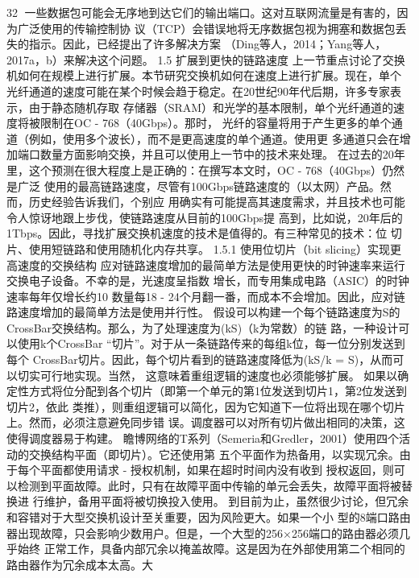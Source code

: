                                                                     32
一些数据包可能会无序地到达它们的输出端口。这对互联网流量是有害的，因为广泛使用的传输控制协
议（TCP）会错误地将无序数据包视为拥塞和数据包丢失的指示。因此，已经提出了许多解决方案
（Ding等人，2014；Yang等人，2017a，b）来解决这个问题。
1.5 扩展到更快的链路速度
上一节重点讨论了交换机如何在规模上进行扩展。本节研究交换机如何在速度上进行扩展。现在，单个
光纤通道的速度可能在某个时候会趋于稳定。在20世纪90年代后期，许多专家表示，由于静态随机存取
存储器（SRAM）和光学的基本限制，单个光纤通道的速度将被限制在OC - 768（40Gbps）。那时，
光纤的容量将用于产生更多的单个通道（例如，使用多个波长），而不是更高速度的单个通道。使用更
多通道只会在增加端口数量方面影响交换，并且可以使用上一节中的技术来处理。
在过去的20年里，这个预测在很大程度上是正确的：在撰写本文时，OC - 768（40Gbps）仍然是广泛
使用的最高链路速度，尽管有100Gbps链路速度的（以太网）产品。然而，历史经验告诉我们，个别应
用确实有可能提高其速度需求，并且技术也可能令人惊讶地跟上步伐，使链路速度从目前的100Gbps提
高到，比如说，20年后的1Tbps。因此，寻找扩展交换机速度的技术是值得的。有三种常见的技术：位
切片、使用短链路和使用随机化内存共享。
1.5.1 使用位切片（bit slicing）实现更高速度的交换结构
应对链路速度增加的最简单方法是使用更快的时钟速率来运行交换电子设备。不幸的是，光速度呈指数
增长，而专用集成电路（ASIC）的时钟速率每年仅增长约10%
数量每18 - 24个月翻一番，而成本不会增加。因此，应对链路速度增加的最简单方法是使用并行性。
假设可以构建一个每个链路速度为S的CrossBar交换结构。那么，为了处理速度为(kS)（k为常数）的链
路，一种设计可以使用k个CrossBar “切片”。对于从一条链路传来的每组k位，每一位分别发送到每个
CrossBar切片。因此，每个切片看到的链路速度降低为(kS/k = S)，从而可以切实可行地实现。当然，
这意味着重组逻辑的速度也必须能够扩展。
如果以确定性方式将位分配到各个切片（即第一个单元的第1位发送到切片1，第2位发送到切片2，依此
类推），则重组逻辑可以简化，因为它知道下一位将出现在哪个切片上。然而，必须注意避免同步错
误。调度器可以对所有切片做出相同的决策，这使得调度器易于构建。
瞻博网络的T系列（Semeria和Gredler，2001）使用四个活动的交换结构平面（即切片）。它还使用第
五个平面作为热备用，以实现冗余。由于每个平面都使用请求 - 授权机制，如果在超时时间内没有收到
授权返回，则可以检测到平面故障。此时，只有在故障平面中传输的单元会丢失，故障平面将被替换进
行维护，备用平面将被切换投入使用。
到目前为止，虽然很少讨论，但冗余和容错对于大型交换机设计至关重要，因为风险更大。如果一个小
型的8端口路由器出现故障，只会影响少数用户。但是，一个大型的256×256端口的路由器必须几乎始终
正常工作，具备内部冗余以掩盖故障。这是因为在外部使用第二个相同的路由器作为冗余成本太高。大
